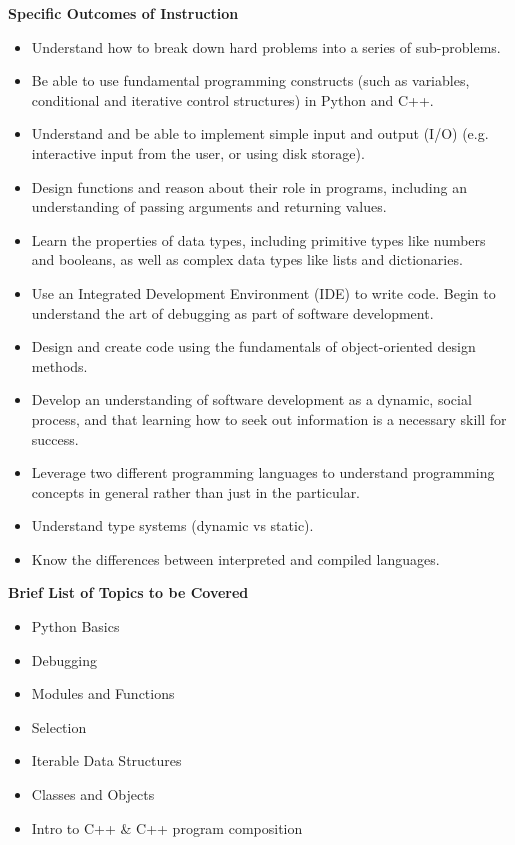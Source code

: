 \documentclass{article}
\begin{document}
\noindent \textbf{Specific Outcomes of Instruction}
\begin{itemize}
    \item Understand how to break down hard problems into a series of sub-problems.
    \item Be able to use fundamental programming constructs (such as variables, conditional and iterative control structures) in Python and C++.
    \item Understand and be able to implement simple input and output (I/O) (e.g. interactive input from the user, or using disk storage).
    \item Design functions and reason about their role in programs, including an understanding of passing arguments and returning values.
    \item Learn the properties of data types, including primitive types like numbers and booleans, as well as complex data types like lists and dictionaries.
    \item Use an Integrated Development Environment (IDE) to write code.  Begin to understand the art of debugging as part of software development.
    \item Design and create code using the fundamentals of object-oriented design methods.
    \item Develop an understanding of software development as a dynamic, social process, and that learning how to seek out information is a necessary skill for success.
    \item Leverage two different programming languages to understand programming concepts in general rather than just in the particular.
    \item Understand type systems (dynamic vs static).
    \item Know the differences between interpreted and compiled languages.
\end{itemize}

\noindent \textbf{Brief List of Topics to be Covered}
\begin{itemize}
    \item Python Basics
    \item Debugging
    \item Modules and Functions
    \item Selection
    \item Iterable Data Structures
    \item Classes and Objects
    \item Intro to C++ \& C++ program composition
\end{itemize}
\end{document}
